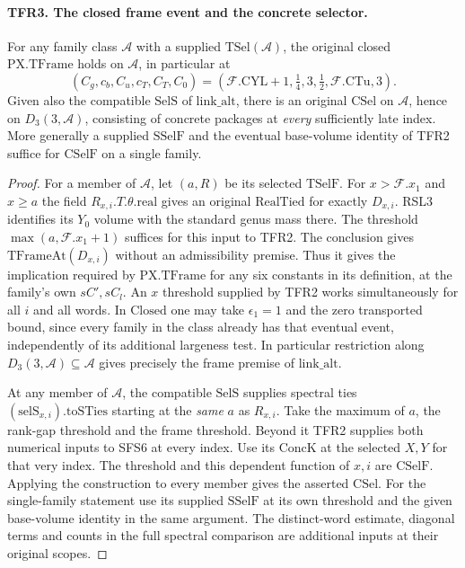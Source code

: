 \paragraph{TFR3. The closed frame event and the concrete selector.}
\label{claim:TFR3}
For any family class $\mathcal A$ with a supplied
$\mathrm{TSel}(\mathcal A)$, the original closed
$\mathrm{PX.TFrame}$ holds on $\mathcal A$, in particular at
\[
 (C_g,c_b,C_u,c_T,C_T,C_0)
   =(\mathcal F.\mathrm{CYL}+1,\tfrac14,3,\tfrac12,
                                    \mathcal F.\mathrm{CTu},3).
\]
Given also the compatible $\mathrm{SelS}$ of
$\mathrm{link\_alt}$, there is an original
$\mathrm{CSel}$ on $\mathcal A$, hence on $D_3(3,\mathcal A)$, consisting of concrete
packages at \emph{every} sufficiently late index. More generally a
supplied $\mathrm{SSelF}$ and the eventual base-volume identity
of TFR2 suffice for $\mathrm{CSelF}$ on a single family.

\begin{proof}
For a member of $\mathcal A$, let $(a,R)$ be its selected
$\mathrm{TSelF}$. For $x>\mathcal F.x_1$ and $x\ge a$ the field
$R_{x,i}.T.\theta.\mathrm{real}$ gives an original
$\mathrm{RealTied}$ for exactly $D_{x,i}$. RSL3 identifies its
$Y_0$ volume with the standard genus mass there. The threshold
$\max(a,\mathcal F.x_1+1)$ suffices for this input to TFR2.
The conclusion gives $\mathrm{TFrameAt}(D_{x,i})$ without an
admissibility premise. Thus it gives the implication required by
$\mathrm{PX.TFrame}$ for any six constants in its definition,
at the family's own $sC',sC_l$. An $x$ threshold supplied by
TFR2 works simultaneously for all $i$ and all words. In
$\mathrm{Closed}$ one may take $\epsilon_1=1$ and the zero
transported bound, since every family in the class already has
that eventual event, independently of its additional largeness test.
In particular restriction along $D_3(3,\mathcal A)\subseteq
\mathcal A$ gives precisely the frame premise of $\mathrm{link\_alt}$.

At any member of $\mathcal A$, the compatible $\mathrm{SelS}$
supplies spectral ties $(\mathrm{selS}_{x,i}).\mathrm{toSTies}$
starting at the \emph{same} $a$ as $R_{x,i}$. Take the maximum
of $a$, the rank-gap threshold and the frame threshold. Beyond
it TFR2 supplies both numerical inputs to SFS6 at every index.
Use its $\mathrm{ConcK}$ at the selected $X,Y$ for that very
index. The threshold and this dependent function of $x,i$ are
$\mathrm{CSelF}$. Applying the construction to every member gives
the asserted $\mathrm{CSel}$. For the single-family statement
use its supplied $\mathrm{SSelF}$ at its own threshold and the
given base-volume identity in the same argument. The
distinct-word estimate, diagonal terms and counts in the full
spectral comparison are additional inputs at their original scopes.
\end{proof}

